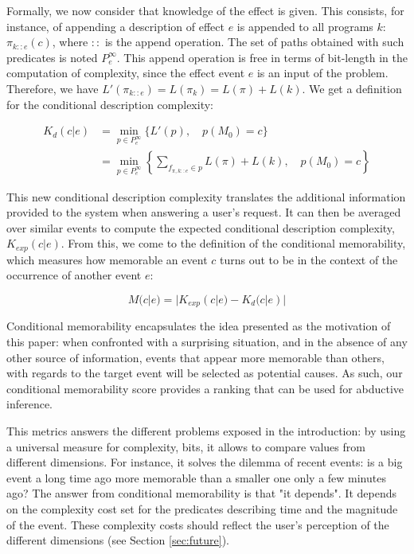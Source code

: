 \documentclass[entropy,article,submit,moreauthors,pdftex]{Definitions/mdpi}
\begin{document}
Formally, we now consider that knowledge of the effect is given. This consists, for instance, of appending a description of effect $e$  is appended to all programs $k$:
$\pi_{k::e}(c)$, where $::$ is the append operation. The set of paths obtained with such predicates is noted $P^\infty_e$. This append operation is free in terms of bit-length in the computation of complexity, since the effect event $e$ is an input of the problem. Therefore, we have $L'(\pi_{k::e}) = L(\pi_k) = L(\pi) + L(k)$. We get a definition for the conditional description complexity:

\begin{align}
    \label{eq:abd_k}
    K_d(c | e) & = \min_{p \in P^\infty_e} \{L'(p), \quad p(M_0)=c \}                                                \\
               & = \min_{p \in P^\infty_e} \left\{\sum_{f_{\pi, k::e} \in p} L(\pi) + L(k), \quad p(M_0) = c\right\}
\end{align}

This new conditional description complexity translates the additional information provided to the
system when answering a user's request. It can then be averaged over similar events to compute the expected conditional description complexity, $K_{exp}(c|e)$. From this, we come to the definition of the conditional memorability, which measures how memorable an event $c$ turns out to be in the context of the occurrence of another event $e$:

\begin{equation}
    \label{eq:cond_mem}
    M(c|e) = |K_{exp}(c|e) - K_d(c|e)|
\end{equation}

Conditional memorability encapsulates the idea
presented as the motivation of this paper: when confronted with a surprising
situation, and in the absence of any other source of information, events that appear more memorable than others, with regards to the target event will be selected as potential causes. As such, our conditional memorability score provides a ranking that can be used for abductive inference.

This metrics answers the different problems exposed in the introduction: by using a universal measure for complexity, bits, it allows to compare values from different dimensions. For instance, it solves the dilemma of recent events: is a big event a long time ago more memorable than a smaller one only a few minutes ago? The answer from conditional memorability is that "it depends". It depends on the complexity cost set for the predicates describing time and the magnitude of the event. These complexity costs should reflect the user's perception of the different dimensions (see Section \ref{sec:future}).
\end{document}
